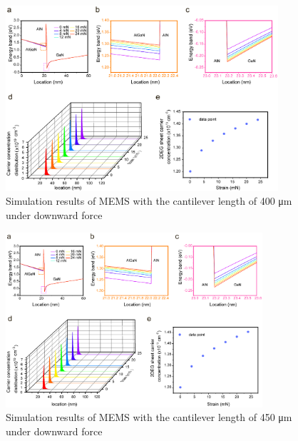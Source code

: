 \begin{figure}[H] 
\centering    
\includegraphics[width=0.9\textwidth]{ch2_400}
\caption[Simulation results of MEMS with the cantilever length of 400 \unit{\um} under downward force]{Simulation results of MEMS with the cantilever length of 400 \unit{\um} under downward force}
\label{fig:2.400}
\end{figure}

\begin{figure}[H] 
\centering    
\includegraphics[width=0.85\textwidth]{ch2_450}
\caption[Simulation results of MEMS with the cantilever length of 450 \unit{\um} under downward force]{Simulation results of MEMS with the cantilever  length of 450 \unit{\um} under downward force}
\label{fig:2.450}
\end{figure}

